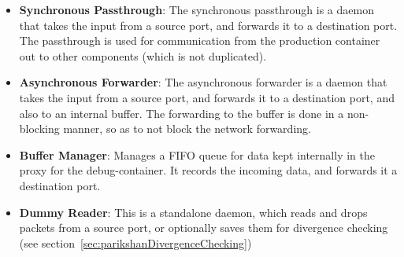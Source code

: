 \begin{itemize}[leftmargin=*]
	\item \textbf{Synchronous Passthrough}: The synchronous passthrough is a daemon that takes the input from a source port, and forwards it to a destination port. The passthrough is used for communication from the production container out to other components (which is not duplicated).
	\item \textbf{Asynchronous Forwarder}: The asynchronous forwarder is a daemon that takes the input from a source port, and forwards it to a destination port, and also to an internal buffer. The forwarding to the buffer is done in a non-blocking manner, so as to not block the network forwarding. 
	\item \textbf{Buffer Manager}: Manages a FIFO queue for data kept internally in the proxy for the debug-container.
	It records the incoming data, and forwards it a destination port. 
	\item \textbf{Dummy Reader}: This is a standalone daemon, which reads and drops packets from a source port, or optionally saves them for divergence checking (see section~\ref{sec:parikshanDivergenceChecking})
\end{itemize}

\noindent

